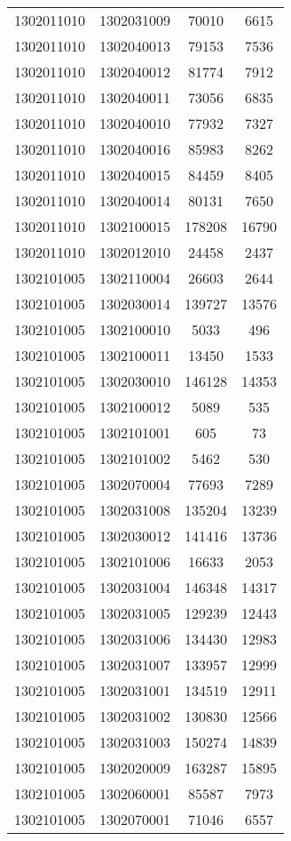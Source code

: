 \begin{longtable}[h]{llcc}
		1302011010 & 1302031009 & 70010 & 6615\\
		1302011010 & 1302040013 & 79153 & 7536\\
		1302011010 & 1302040012 & 81774 & 7912\\
		1302011010 & 1302040011 & 73056 & 6835\\
		1302011010 & 1302040010 & 77932 & 7327\\
		1302011010 & 1302040016 & 85983 & 8262\\
		1302011010 & 1302040015 & 84459 & 8405\\
		1302011010 & 1302040014 & 80131 & 7650\\
		1302011010 & 1302100015 & 178208 & 16790\\
		1302011010 & 1302012010 & 24458 & 2437\\
		1302101005 & 1302110004 & 26603 & 2644\\
		1302101005 & 1302030014 & 139727 & 13576\\
		1302101005 & 1302100010 & 5033 & 496\\
		1302101005 & 1302100011 & 13450 & 1533\\
		1302101005 & 1302030010 & 146128 & 14353\\
		1302101005 & 1302100012 & 5089 & 535\\
		1302101005 & 1302101001 & 605 & 73\\
		1302101005 & 1302101002 & 5462 & 530\\
		1302101005 & 1302070004 & 77693 & 7289\\
		1302101005 & 1302031008 & 135204 & 13239\\
		1302101005 & 1302030012 & 141416 & 13736\\
		1302101005 & 1302101006 & 16633 & 2053\\
		1302101005 & 1302031004 & 146348 & 14317\\
		1302101005 & 1302031005 & 129239 & 12443\\
		1302101005 & 1302031006 & 134430 & 12983\\
		1302101005 & 1302031007 & 133957 & 12999\\
		1302101005 & 1302031001 & 134519 & 12911\\
		1302101005 & 1302031002 & 130830 & 12566\\
		1302101005 & 1302031003 & 150274 & 14839\\
		1302101005 & 1302020009 & 163287 & 15895\\
		1302101005 & 1302060001 & 85587 & 7973\\
		1302101005 & 1302070001 & 71046 & 6557\\

\end{longtable}
